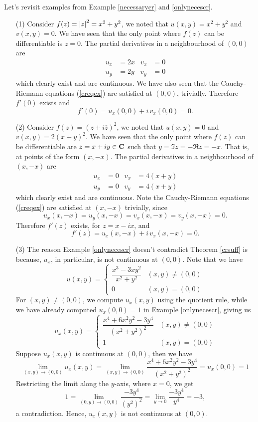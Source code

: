 \medskip

\begin{example}
Let's revisit examples from Example \ref{necessarycr} and \ref{onlynecescr}.
\begin{itemize}
\item[(1)] Consider $f(z) = \left\lvert z\right\rvert^2 = x^2 + y^2$, we noted that $u(x,y) = x^2 + y^2$ and $v(x,y) = 0$. We have seen that the only point where $f(z)$ can be differentiable is $z = 0$. The partial derivatives in a neighbourhood of $(0,0)$ are
\begin{align*}
u_x &= 2x & v_x &= 0\\[0.5em]
u_y &= 2y & v_y &= 0
\end{align*}
which clearly exist and are continuous. We have also seen that the Cauchy-Riemann equations (\ref{creqex}) are satisfied at $(0,0)$, trivially. Therefore $f'(0)$ exists and \[f'(0) = u_x(0,0) + i\,v_x(0,0) = 0.\]

\item[(2)] Consider $f(z) = (z + i\overline{z})^2$, we noted that $u(x,y) = 0$ and $v(x,y) = 2(x + y)^2$. We have seen that the only point where $f(z)$ can be differentiable are $z = x + iy \in \mathbf C$ such that $y = \Im z = -\Re z = -x$. That is, at points of the form $(x,-x)$. The partial derivatives in a neighbourhood of $(x,-x)$ are
\begin{align*}
u_x &= 0 & v_x &= 4(x + y)\\[0.5em]
u_y &= 0 & v_y &= 4(x + y)
\end{align*}
which clearly exist and are continuous. Note the Cauchy-Riemann equations (\ref{creqex}) are satisfied at $(x,-x)$ trivially, since \[u_x(x,-x) = u_y(x,-x) = v_x(x,-x) = v_y(x,-x) = 0.\]
Therefore $f'(z)$ exists, for $z = x - ix$, and \[f'(z) = u_x(x,-x) + i\,v_x(x,-x) = 0.\]

\item[(3)] The reason Example \ref{onlynecescr} doesn't contradict Theorem \ref{crsuff} is because, $u_x$, in particular, is not continuous at $(0,0)$. Note that we have
\[u(x,y) = \begin{cases}\dfrac{x^3 - 3xy^2}{x^2 + y^2} & (x,y) \neq (0,0)\\[1em] 0 & (x,y) = (0,0) \end{cases}\]
For $(x,y) \neq (0,0)$, we compute $u_x(x,y)$ using the quotient rule, while we have already computed $u_x(0,0) = 1$ in Example \ref{onlynecescr}, giving us
\[u_x(x,y) = \begin{cases}\dfrac{x^4 + 6x^2y^2 - 3y^4}{(x^2 + y^2)^2} & (x,y) \neq (0,0)\\[1em] 1 & (x,y) = (0,0) \end{cases}\]
Suppose $u_x(x,y)$ is continuous at $(0,0)$, then we have
\[\lim_{(x,y) \to (0,0)}u_x(x,y) = \lim_{(x,y) \to (0,0)}\dfrac{x^4 + 6x^2y^2 - 3y^4}{(x^2 + y^2)^2} = u_x(0,0) = 1\]
Restricting the limit along the $y$-axis, where $x = 0$, we get
\[1 = \lim_{(0,y) \to (0,0)}\dfrac{-3y^4}{(y^2)^2} = \lim_{y \to 0}\dfrac{-3y^4}{y^4} = -3,\]
a contradiction. Hence, $u_x(x,y)$ is not continuous at $(0,0)$.
\end{itemize}
\end{example}

